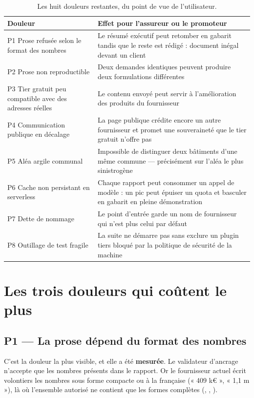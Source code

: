 \begin{table}[h]
\centering
\small
\begin{tabularx}{\textwidth}{@{}p{4.3cm}X@{}}
\toprule
\textbf{Douleur} & \textbf{Effet pour l'assureur ou le promoteur} \\
\midrule
P1 Prose refusée selon le format des nombres & Le résumé exécutif peut retomber
  en gabarit tandis que le reste est rédigé : document inégal devant un client \\
P2 Prose non reproductible & Deux demandes identiques peuvent produire deux
  formulations différentes \\
P3 Tier gratuit peu compatible avec des adresses réelles & Le contenu envoyé
  peut servir à l'amélioration des produits du fournisseur \\
P4 Communication publique en décalage & La page publique crédite encore un autre
  fournisseur et promet une souveraineté que le tier gratuit n'offre pas \\
P5 Aléa argile communal & Impossible de distinguer deux bâtiments d'une même
  commune — précisément sur l'aléa le plus sinistrogène \\
P6 Cache non persistant en serverless & Chaque rapport peut consommer un appel
  de modèle : un pic peut épuiser un quota et basculer en gabarit en pleine
  démonstration \\
P7 Dette de nommage & Le point d'entrée garde un nom de fournisseur qui n'est
  plus celui par défaut \\
P8 Outillage de test fragile & La suite ne démarre pas sans exclure un plugin
  tiers bloqué par la politique de sécurité de la machine \\
\bottomrule
\end{tabularx}
\caption{Les huit douleurs restantes, du point de vue de l'utilisateur.}
\end{table}

\section{Les trois douleurs qui coûtent le plus}

\subsection{P1 — La prose dépend du format des nombres}

C'est la douleur la plus visible, et elle a été \textbf{mesurée}. Le validateur
d'ancrage n'accepte que les nombres présents dans le rapport. Or le fournisseur
actuel écrit volontiers les nombres sous forme compacte ou à la française
(« 409 k€ », « 1,1 m »), là où l'ensemble autorisé ne contient que les formes
complètes (, , ).

